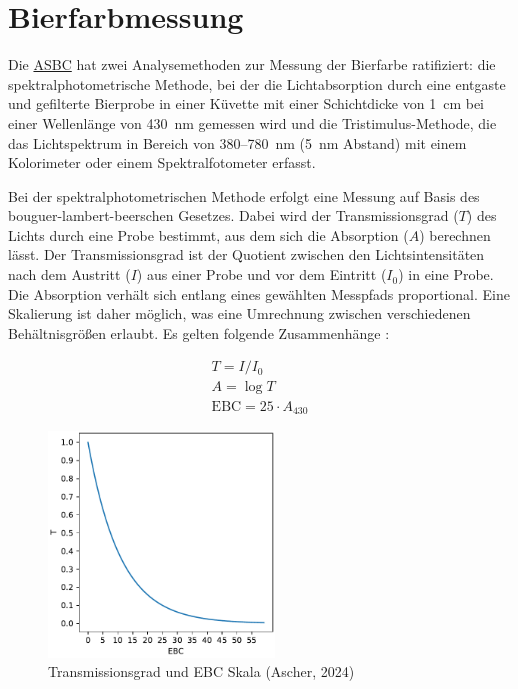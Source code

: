 \documentclass[10pt,a4paper,DIV=12,parskip=half]{scrarticle}
\begin{document}
\section*{Bierfarbmessung}

Die \href{https://www.asbcnet.org}{ASBC} hat zwei Analysemethoden zur Messung der Bierfarbe ratifiziert: die spektralphotometrische Methode, bei der die Lichtabsorption durch eine entgaste und gefilterte Bierprobe in einer Küvette mit einer Schichtdicke von 1~cm bei einer Wellenlänge von 430~nm gemessen wird und die Tristimulus-Methode, die das Lichtspektrum in Bereich von 380--780~nm (5~nm Abstand) mit einem Kolorimeter oder einem Spektralfotometer erfasst. \parencite{ASBC2011}

Bei der spektralphotometrischen Methode erfolgt eine Messung auf Basis des bouguer-lambert-beerschen Gesetzes. Dabei wird der Transmissionsgrad ($T$) des Lichts durch eine Probe bestimmt, aus dem sich die Absorption ($A$) berechnen lässt. Der Transmissionsgrad ist der Quotient zwischen den Lichtsintensitäten nach dem Austritt ($I$) aus einer Probe und vor dem Eintritt ($I_0$) in eine Probe. Die Absorption verhält sich entlang eines gewählten Messpfads proportional. Eine Skalierung ist daher möglich, was eine Umrechnung zwischen verschiedenen Behältnisgrößen erlaubt. Es gelten folgende Zusammenhänge \parencite{deLange2016}:

\begin{equation*}
	\begin{gathered}
		T =  I / I_0 \\
		A = \log T \\		
		\textrm{EBC} = 25 \cdot A_{430}
	\end{gathered}
\end{equation*}

\begin{figure}[H]
	\centering
	\includegraphics[width=6cm]{transmission.pdf}
	\caption{Transmissionsgrad und EBC Skala (Ascher, 2024)}
	\label{fig:transmission}
\end{figure}
\end{document}
